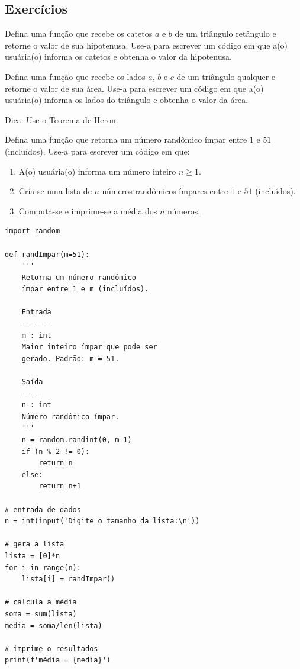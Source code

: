 \subsection{Exercícios}

\begin{exer}
  Defina uma função que recebe os catetos $a$ e $b$ de um triângulo retângulo e retorne o valor de sua hipotenusa. Use-a para escrever um código em que a(o) usuária(o) informa os catetos e obtenha o valor da hipotenusa.
\end{exer}

\begin{exer}
  Defina uma função que recebe os lados $a$, $b$ e $c$ de um triângulo qualquer e retorne o valor de sua área. Use-a para escrever um código em que a(o) usuária(o) informa os lados do triângulo e obtenha o valor da área.  
\end{exer}
\begin{resp}
  Dica: Use o \href{https://pt.wikipedia.org/wiki/Teorema\_de\_Her\%C3\%A3o}{Teorema de Heron}.
\end{resp}

\begin{exer}
  Defina uma função que retorna um número randômico ímpar entre $1$ e $51$ (incluídos). Use-a para escrever um código em que:
  \begin{enumerate}[1.]
  \item A(o) usuária(o) informa um número inteiro $n\geq 1$.
  \item Cria-se uma lista de $n$ números randômicos ímpares entre $1$ e $51$ (incluídos).
  \item Computa-se e imprime-se a média dos $n$ números.
  \end{enumerate}
\end{exer}
\begin{resp}

\begin{lstlisting}
import random

def randImpar(m=51):
    '''
    Retorna um número randômico
    ímpar entre 1 e m (incluídos).

    Entrada
    -------
    m : int
    Maior inteiro ímpar que pode ser 
    gerado. Padrão: m = 51.

    Saída
    -----
    n : int
    Número randômico ímpar.
    '''
    n = random.randint(0, m-1)
    if (n % 2 != 0):
        return n
    else:
        return n+1

# entrada de dados
n = int(input('Digite o tamanho da lista:\n'))

# gera a lista
lista = [0]*n
for i in range(n):
    lista[i] = randImpar()

# calcula a média
soma = sum(lista)
media = soma/len(lista)

# imprime o resultados
print(f'média = {media}')
\end{lstlisting}

\end{resp}

